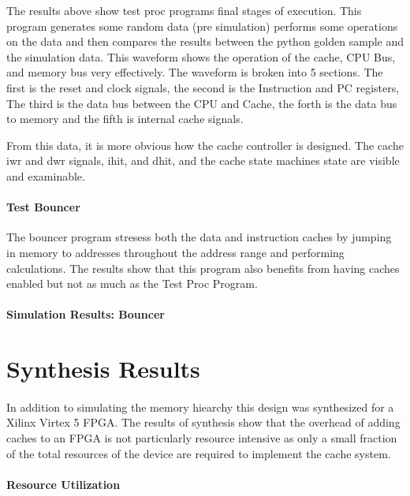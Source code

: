 \documentclass[11pt,letterpaper,]{article}
\begin{document}
The results above show test proc programs final stages of execution.  This program generates some random data (pre simulation) performs some operations on the data and then compares the results between the python golden sample and the simulation data.  This waveform shows the operation of the cache, CPU Bus, and memory bus very effectively.  The waveform is broken into 5 sections.  The first is the reset and clock signals, the second is the Instruction and PC registers, The third is the data bus between the CPU and Cache, the forth is the data bus to memory and the fifth is internal cache signals.

From this data, it is more obvious how the cache controller is designed.  The cache iwr and dwr signals, ihit, and dhit, and the cache state machines state are visible and examinable.

\paragraph{ Test Bouncer }
The bouncer program stresess both the data and instruction caches by jumping in memory to addresses throughout the address range and performing calculations.  The results show that this program also benefits from having caches enabled but not as much as the Test Proc Program.  

\paragraph{ Simulation Results: Bouncer }


\section{ Synthesis Results }
\label{Results:Synthesis}
\paragraph{}
In addition to simulating the memory hiearchy this design was synthesized for a Xilinx Virtex 5 FPGA.  The results of synthesis show that the overhead of adding caches to an FPGA is not particularly resource intensive as only a small fraction of the total resources of the device are required to implement the cache system.
\paragraph{ Resource Utilization }
\end{document}
